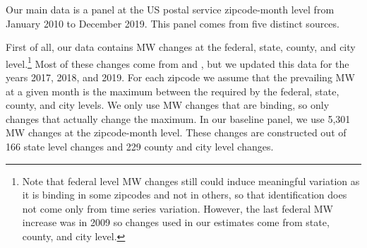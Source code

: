 
Our main data is a panel at the US postal service zipcode-month level from January 2010 to December 
2019. This panel comes from five distinct sources.

First of all, our data contains MW changes at the federal, state, county, and city level.\footnote{
	Note that federal level MW changes still could induce meaningful variation as it is binding in 
	some zipcodes and not in others, so that identification does not come only from time series 
	variation. However, the last federal MW increase was in 2009 so changes used in our estimates come 
	from state, county, and city level.} 
Most of these changes come from \textcite{VaghulZipperer2016} and \textcite{cengiz2019effect}, but 
we updated this data for the years 2017, 2018, and 2019. For each zipcode we assume that the prevailing 
MW at a given month is the maximum between the required by the federal, state, county, and city levels. 
We only use MW changes that are binding, so only changes that actually change the maximum. In our 
baseline panel, we use 5,301 MW changes at the zipcode-month level. These changes are constructed out 
of 166 state level changes and 229 county and city level changes.


